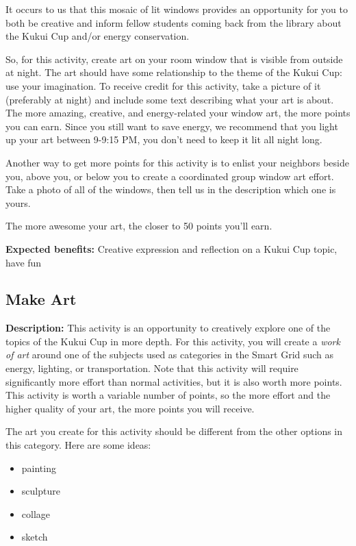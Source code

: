 It occurs to us that this mosaic of lit windows provides an opportunity for you to both be creative and inform fellow students coming back from the library about the Kukui Cup and/or energy conservation.

So, for this activity, create art on your room window that is visible from outside at night. The art should have some relationship to the theme of the Kukui Cup: use your imagination. To receive credit for this activity, take a picture of it (preferably at night) and include some text describing what your art is about. The more amazing, creative, and energy-related your window art, the more points you can earn. Since you still want to save energy, we recommend that you light up your art between 9-9:15 PM, you don't need to keep it lit all night long.

Another way to get more points for this activity is to enlist your neighbors beside you, above you, or below you to create a coordinated group window art effort. Take a photo of all of the windows, then tell us in the description which one is yours.

The more awesome your art, the closer to 50 points you'll earn.

\vspace{2ex}
\textbf{Expected benefits:} Creative expression and reflection on a Kukui Cup topic, have fun


\subsection{Make Art}

\textbf{Description:} This activity is an opportunity to creatively explore one of the topics of the Kukui Cup in more depth. For this activity, you will create a \emph{work of art} around one of the subjects used as categories in the Smart Grid such as energy, lighting, or transportation. Note that this activity will require significantly more effort than normal activities, but it is also worth more points. This activity is worth a variable number of points, so the more effort and the higher quality of your art, the more points you will receive.

The art you create for this activity should be different from the other options in this category. Here are some ideas:

\begin{itemize}
	\item painting
	\item sculpture
	\item collage
	\item sketch
\end{itemize}

